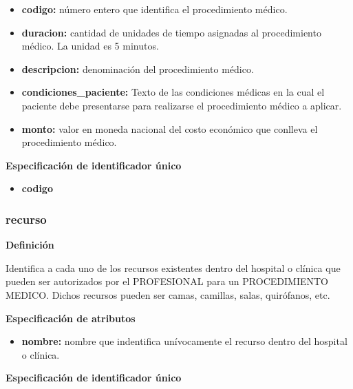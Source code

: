 \documentclass[a4paper,11pt]{article}
\begin{document}
\begin{itemize}

     \item \textbf{codigo:} número entero que identifica el procedimiento médico.

     \item \textbf{duracion:} cantidad de unidades de tiempo asignadas al procedimiento médico. La unidad es 5 minutos.

     \item \textbf{descripcion:} denominación del procedimiento médico.

     \item \textbf{condiciones\_paciente:} Texto de las condiciones médicas en la cual el paciente 
     debe presentarse para realizarse el procedimiento médico a aplicar.

     \item \textbf{monto:} valor en moneda nacional del costo económico que conlleva el procedimiento médico.

\end{itemize}

\textbf{Especificación de identificador único}

\begin{itemize}

     \item \textbf{codigo}

\end{itemize}

\subsubsection{\textbf{recurso}}

\textbf{Definición}

Identifica a cada uno de los recursos existentes dentro del hospital o clínica
que pueden ser autorizados por el PROFESIONAL para un PROCEDIMIENTO MEDICO.
Dichos recursos pueden ser camas, camillas, salas, quirófanos, etc.

\textbf{Especificación de atributos}

\begin{itemize}

     \item \textbf{nombre:} nombre que indentifica unívocamente el recurso dentro del hospital o clínica.

\end{itemize}

\textbf{Especificación de identificador único}
\end{document}
